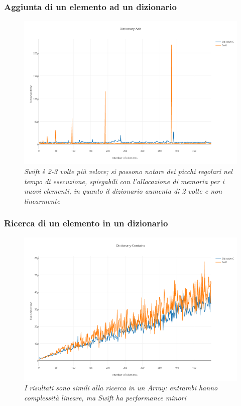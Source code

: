 \subsubsection{Aggiunta di un elemento ad un dizionario}
\begin{figure}[H]
      \centering
      \includegraphics[scale=0.50]{immagini/dictionary_add.png}
            \vspace{0.8cm}
            \caption{\textit{Swift è 2-3 volte più veloce; si possono notare dei picchi regolari nel tempo di esecuzione, spiegabili con l'allocazione di memoria per i nuovi elementi, in quanto il dizionario aumenta di 2 volte e non linearmente}}
\end{figure} 
\subsubsection{Ricerca di un elemento in un dizionario}
\begin{figure}[H]
      \centering
      \includegraphics[scale=0.50]{immagini/dictionary_contains.png}
            \vspace{0.8cm}
            \caption{\textit{I risultati sono simili alla ricerca in un Array: entrambi hanno complessità lineare, ma Swift ha performance minori}}
\end{figure}
